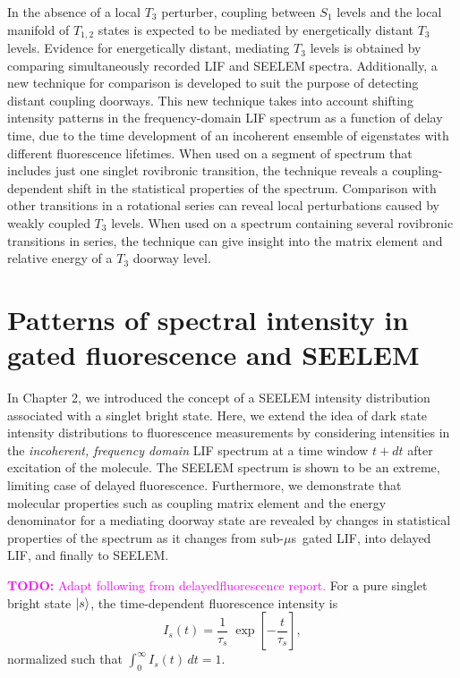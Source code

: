 \documentclass[12pt]{mitthesis}
\newcommand{\TODO} [1]{\textcolor{magenta}{\textbf{TODO:} #1}}
\newcommand{\microsec}{$\mu$s}
\begin{document}
In the absence of a local $T_3$ perturber, coupling between $S_1$
levels and the local manifold of $T_{1,2}$ states is expected to be
mediated by energetically distant $T_3$ levels.  Evidence for
energetically distant, mediating $T_3$ levels is obtained by comparing
simultaneously recorded LIF and SEELEM spectra.  Additionally, a new
technique for comparison is developed to suit the purpose of detecting
distant coupling doorways.  This new technique takes into account
shifting intensity patterns in the frequency-domain LIF spectrum as a
function of delay time, due to the time development of an incoherent
ensemble of eigenstates with different fluorescence lifetimes.  When
used on a segment of spectrum that includes just one singlet
rovibronic transition, the technique reveals a coupling-dependent
shift in the statistical properties of the spectrum.  Comparison with
other transitions in a rotational series can reveal local
perturbations caused by weakly coupled $T_3$ levels.  When used on a
spectrum containing several rovibronic transitions in series, the
technique can give insight into the matrix element and relative energy
of a $T_3$ doorway level.

\section{Patterns of spectral intensity in gated fluorescence and
  SEELEM}

In Chapter 2, we introduced the concept of a SEELEM intensity
distribution associated with a singlet bright state.  Here, we extend
the idea of dark state intensity distributions to fluorescence
measurements by considering intensities in the \emph{incoherent,
  frequency domain} LIF spectrum at a time window $t+dt$ after
excitation of the molecule.  The SEELEM spectrum is shown to be an
extreme, limiting case of delayed fluorescence.  Furthermore, we
demonstrate that molecular properties such as coupling matrix element
and the energy denominator for a mediating doorway state are revealed
by changes in statistical properties of the spectrum as it changes
from sub-\microsec\ gated LIF, into delayed LIF, and finally to
SEELEM.

\TODO{Adapt following from delayedfluorescence report.}  For a pure
singlet bright state $\mathinner{|{s}\rangle}$, the time-dependent fluorescence
intensity is
\begin{equation}
  I_s(t) = \frac{1}{\tau_s} \;
           \exp \left[
             -\frac{t}{ \tau_s} 
           \right],
\end{equation}
normalized such that $\int_0^{\infty} I_s(t) \, dt = 1$.
\end{document}
